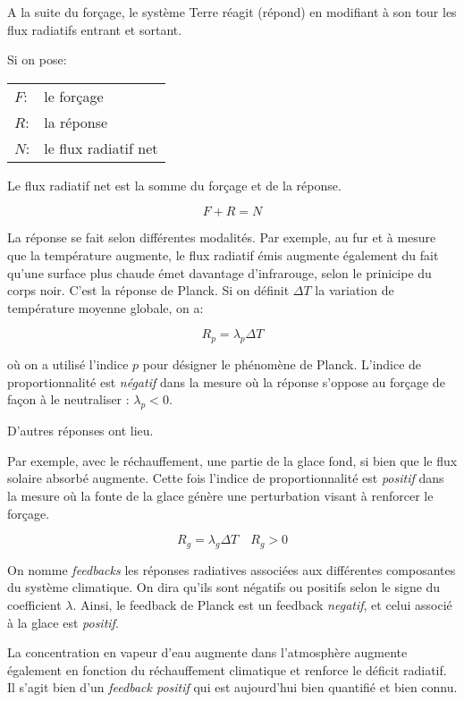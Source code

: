 A la suite du forçage, le système Terre réagit (répond)  en modifiant à son tour les flux radiatifs entrant et sortant. 

Si on pose: 

\begin{tabular}{ll}
  $F$: & le forçage \\
  $R$: & la réponse \\
  $N$: & le flux radiatif net 
\end{tabular}

Le flux radiatif net est la somme du forçage et de la réponse. 

\begin{equation}
  F + R = N
\end{equation}

La réponse se fait selon différentes modalités. Par exemple, au fur et à mesure que la température augmente, le flux radiatif émis augmente également du fait qu'une surface plus chaude émet davantage d'infrarouge, selon le prinicipe du corps noir. C'est la réponse de Planck. Si on définit $\Delta T$ la variation de température moyenne globale, on a:

\begin{equation}
  R_p = \lambda_p \Delta T
\end{equation}

où on a utilisé l'indice $p$ pour désigner le phénomène de Planck. L'indice de proportionnalité est \emph{négatif} dans la mesure où la réponse s'oppose au forçage de façon à le neutraliser : $\lambda_p < 0$. 

D'autres réponses ont lieu. 

Par exemple, avec le réchauffement, une partie de la glace fond, si bien que le flux solaire absorbé augmente. Cette fois l'indice de proportionnalité est \emph{positif} dans la mesure où la fonte de la glace génère une perturbation visant à renforcer le forçage. 

\begin{equation}
  R_g = \lambda_g \Delta T \quad R_g>0
\end{equation}

On nomme \emph{feedbacks} les réponses radiatives associées aux différentes composantes du système climatique. On dira qu'ils sont négatifs ou positifs selon le signe du coefficient $\lambda$. Ainsi, le feedback de Planck est un feedback \emph{negatif}, et celui associé à la glace est \emph{positif}. 

La concentration en vapeur d'eau augmente dans l'atmosphère augmente également en fonction du réchauffement climatique et renforce le déficit radiatif. Il s'agit bien d'un \emph{feedback positif} qui est aujourd'hui bien quantifié et bien connu. 

